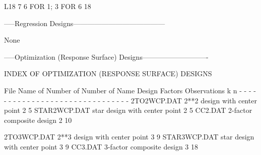   L18            7            6 FOR  1; 3 FOR   6   18
 
 
 
-----Regression Designs---------------------------------------
 
None
 
 
 
-----Optimization (Response Surface) Designs----------------------------
 
      INDEX OF OPTIMIZATION (RESPONSE SURFACE) DESIGNS
 
File           Name of                    Number of   Number of
Name           Design                      Factors   Observations
                                              k           n
- - - - - - - - - - - - - - - - - - - - - - - - - - - - - - -
2TO2WCP.DAT    2**2 design with center point  2          5
STAR2WCP.DAT   star design with center point  2          5
CC2.DAT        2-factor composite design      2         10
 
2TO3WCP.DAT    2**3 design with center point  3          9
STAR3WCP.DAT   star design with center point  3          9
CC3.DAT        3-factor composite design      3         18
 
